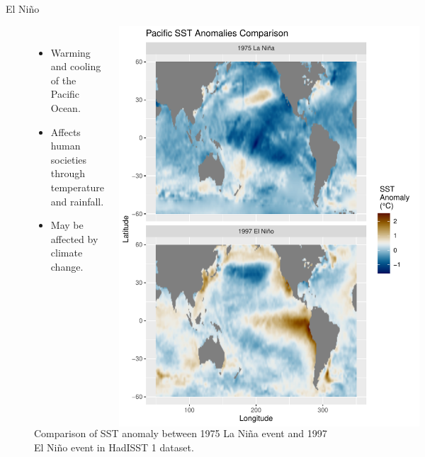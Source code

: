 \documentclass{beamer}
\begin{document}
\begin{frame}{El Niño}
  \begin{figure}
    \begin{columns}
      \begin{itemize}
      \item Warming and cooling of the Pacific Ocean.
      \item Affects human societies through temperature and rainfall. \citep{ropelewski1987global}
      \item May be affected by climate change.
      \end{itemize}
      \caption{Comparison of SST anomaly between 1975 La Niña event and 1997 El Niño event in HadISST 1 dataset. \citep{rayner2003global}}
      \includegraphics[width = \textwidth]{figures/intro_fig.pdf}
    \end{columns}
  \end{figure}
\end{frame}
\end{document}
